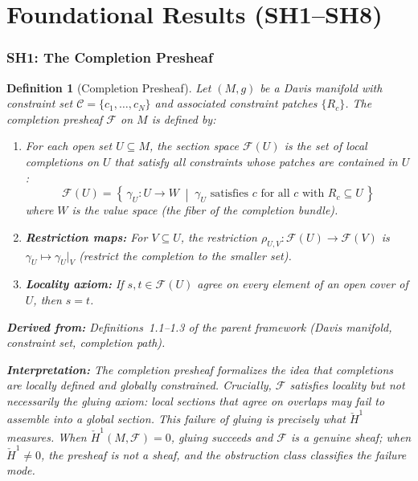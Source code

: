 \documentclass[11pt,letterpaper]{article}
\newtheorem{definition}[conjecture]{Definition}
\newcommand{\Hcech}{\check{H}}
\newcommand{\sheaf}{\mathcal{F}}
\newcommand{\constraint}{\mathcal{C}}
\begin{document}
\newpage
\part{Foundational Results (SH1--SH8)}

\section{SH1: The Completion Presheaf}

\begin{definition}[Completion Presheaf]\label{def:completion_sheaf}
Let $(M, g)$ be a Davis manifold with constraint set $\constraint = 
\{c_1, \ldots, c_N\}$ and associated constraint patches $\{R_c\}$. The 
\emph{completion presheaf} $\sheaf$ on $M$ is defined by:

\begin{enumerate}[label=(\alph*)]
    \item For each open set $U \subseteq M$, the \emph{section space} 
    $\sheaf(U)$ is the set of local completions on $U$ that satisfy all 
    constraints whose patches are contained in $U$:
    \begin{equation}\label{eq:section_space}
        \sheaf(U) = \left\{\, \gamma_U : U \to W \;\middle|\; 
        \gamma_U \text{ satisfies } c \text{ for all } c \text{ with } 
        R_c \subseteq U \,\right\}
    \end{equation}
    where $W$ is the value space (the fiber of the completion bundle).
    
    \item \textbf{Restriction maps:} For $V \subseteq U$, the restriction 
    $\rho_{U,V} : \sheaf(U) \to \sheaf(V)$ is $\gamma_U \mapsto 
    \gamma_U|_V$ (restrict the completion to the smaller set).
    
    \item \textbf{Locality axiom:} If $s, t \in \sheaf(U)$ agree on every 
    element of an open cover of $U$, then $s = t$.
\end{enumerate}

\textbf{Derived from:} Definitions~1.1--1.3 of the parent framework 
(Davis manifold, constraint set, completion path).

\textbf{Interpretation:} The completion presheaf formalizes the idea that 
completions are \emph{locally defined and globally constrained}. 
Crucially, $\sheaf$ satisfies locality but \emph{not necessarily the 
gluing axiom}: local sections that agree on overlaps may fail to 
assemble into a global section. This failure of gluing is precisely 
what $\Hcech^1$ measures. When $\Hcech^1(M, \sheaf) = 0$, gluing 
succeeds and $\sheaf$ is a genuine sheaf; when $\Hcech^1 \neq 0$, the 
presheaf is not a sheaf, and the obstruction class classifies the 
failure mode.
\end{definition}
\end{document}
